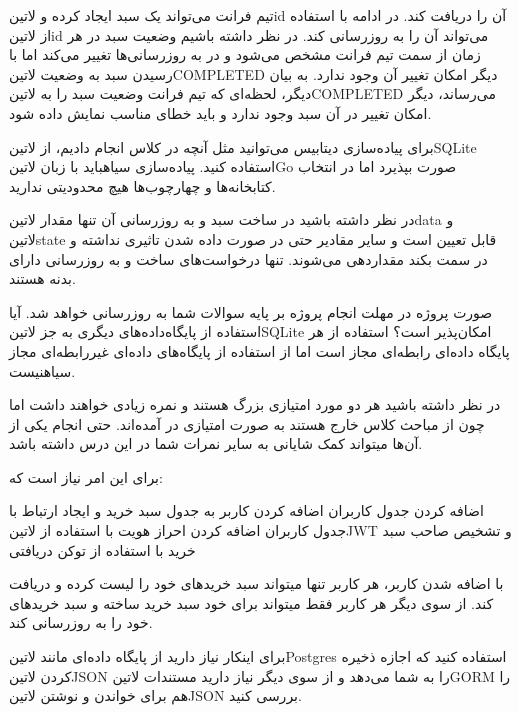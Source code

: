 
تیم فرانت می‌تواند یک سبد ایجاد کرده و ‌لاتین{id} آن را دریافت کند.
در ادامه با استفاده از ‌لاتین{id} می‌تواند آن را به روزرسانی کند.
در نظر داشته باشیم وضعیت سبد در هر زمان از سمت تیم فرانت مشخص می‌شود و در به روزرسانی‌ها تغییر می‌کند اما با رسیدن سبد به وضعیت ‌لاتین{COMPLETED} دیگر امکان تغییر آن وجود ندارد.
به بیان دیگر، لحظه‌ای که تیم فرانت وضعیت سبد را به ‌لاتین{COMPLETED} می‌رساند، دیگر امکان تغییر در آن سبد وجود ندارد و باید خطای مناسب نمایش داده شود.

برای پیاده‌سازی دیتابیس می‌توانید مثل آنچه در کلاس انجام دادیم، از ‌لاتین{SQLite} استفاده کنید.
پیاده‌سازی ‌سیاه{باید} با زبان ‌لاتین{Go} صورت بپذیرد اما در انتخاب کتابخانه‌ها و چهارچوب‌ها هیچ محدودیتی ندارید.

در نظر داشته باشید در ساخت سبد و به روزرسانی آن تنها مقدار ‌لاتین{data} و ‌لاتین{state} قابل تعیین است و سایر مقادیر حتی در صورت داده شدن
تاثیری نداشته و در سمت بکند مقداردهی می‌شوند. تنها درخواست‌های ساخت و به روزرسانی دارای بدنه هستند.


صورت پروژه در مهلت انجام پروژه بر پایه سوالات شما به روزرسانی خواهد شد.
 آیا استفاده از پایگاه‌داده‌های دیگری به جز ‌لاتین{SQLite} امکان‌پذیر است؟
 استفاده از هر پایگاه داده‌ای رابطه‌ای مجاز است اما از استفاده از پایگاه‌های داده‌ای غیررابطه‌ای مجاز ‌سیاه{نیست}.


در نظر داشته باشید هر دو مورد امتیازی بزرگ هستند و نمره زیادی خواهند داشت اما چون از مباحث کلاس خارج هستند به صورت امتیازی در آمده‌اند.
حتی انجام یکی از آن‌ها میتواند کمک شایانی به سایر نمرات شما در این درس داشته باشد.


برای این امر نیاز است که:

 اضافه کردن جدول کاربران
 اضافه کردن کاربر به جدول سبد خرید و ایجاد ارتباط با جدول کاربران
 اضافه کردن احراز هویت با استفاده از ‌لاتین{JWT} و تشخیص صاحب سبد خرید با استفاده از توکن دریافتی

با اضافه شدن کاربر، هر کاربر تنها میتواند سبد خریدهای خود را لیست کرده و دریافت کند.
از سوی دیگر هر کاربر فقط میتواند برای خود سبد خرید ساخته و سبد خریدهای خود را به روزرسانی کند.


برای اینکار نیاز دارید از پایگاه داده‌ای مانند ‌لاتین{Postgres} استفاده کنید
که اجازه ذخیره کردن ‌لاتین{JSON} را به شما می‌دهد و از سوی دیگر نیاز دارید
مستندات ‌لاتین{GORM} را هم برای خواندن و نوشتن ‌لاتین{JSON} بررسی کنید.

